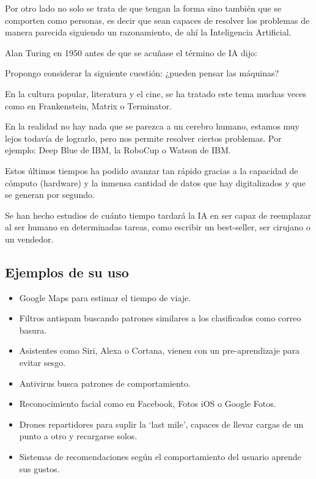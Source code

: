 \documentclass[12pt, twoside, openright]{report} %
\begin{document}
Por otro lado no solo se trata de que tengan la forma sino también que se comporten como personas, es decir que sean capaces de resolver los problemas de manera parecida siguiendo un razonamiento, de ahí la Inteligencia Artificial.

Alan Turing en 1950 antes de que se acuñase el término de IA dijo:
\begin{displayquote}
	Propongo considerar la siguiente cuestión: ¿pueden pensar las máquinas?
\end{displayquote}

En la cultura popular, literatura y el cine, se ha tratado este tema muchas veces como en Frankenstein, Matrix o Terminator.

En la realidad no hay nada que se parezca a un cerebro humano, estamos muy lejos todavía de lograrlo, pero nos permite resolver ciertos problemas. Por ejemplo: Deep Blue de IBM, la RoboCup o Watson de IBM.

Estos últimos tiempos ha podido avanzar tan rápido gracias a la capacidad de cómputo (hardware) y la inmensa cantidad de datos que hay digitalizados y que se generan por segundo.

Se han hecho estudios de cuánto tiempo tardará la IA en ser capaz de reemplazar al ser humano en determinadas tareas, como escribir un best-seller, ser cirujano o un vendedor.

\subsection{Ejemplos de su uso}
\begin{itemize}
	\item Google Maps para estimar el tiempo de viaje.
	\item Filtros antispam buscando patrones similares a los clasificados como correo basura.
	\item Asistentes como Siri, Alexa o Cortana, vienen con un pre-aprendizaje para evitar sesgo.
	\item Antivirus busca patrones de comportamiento.
	\item Reconocimiento facial como en Facebook, Fotos iOS o Google Fotos.
	\item Drones repartidores para suplir la ‘last mile’, capaces de llevar cargas de un punto a otro y recargarse solos.
	\item Sistemas de recomendaciones según el comportamiento del usuario aprende sus gustos.
\end{itemize}
\end{document}
